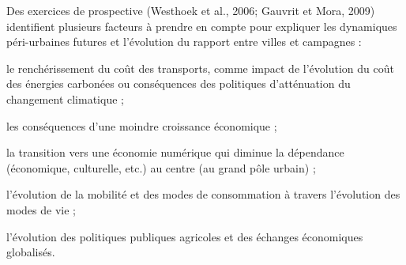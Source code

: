\stopitemize

Des exercices de prospective (Westhoek et al., 2006; Gauvrit et Mora, 2009)
identifient plusieurs facteurs à prendre en compte pour expliquer
les dynamiques péri-urbaines futures et l'évolution du rapport
entre villes et campagnes :

\startitemize

\item	le renchérissement du coût des transports,
	comme impact de l'évolution du coût des énergies carbonées
	ou conséquences des politiques d'atténuation du changement climatique ;

\item 	les conséquences d'une moindre croissance économique ;

\item 	la transition vers une économie numérique
	qui diminue la dépendance (économique, culturelle, etc.)
	au centre (au grand pôle urbain) ;

\item	l'évolution de la mobilité et des modes de consommation
	à travers l'évolution des modes de vie ;

\item	l'évolution des politiques publiques agricoles
	et des échanges économiques globalisés.

\stopitemize